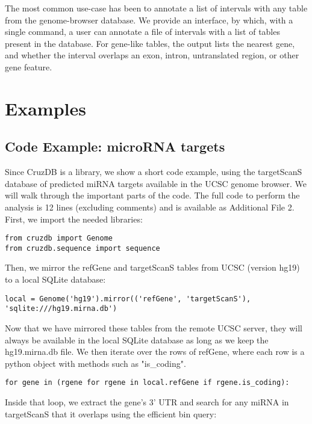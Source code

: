 \documentclass[10pt]{bmc_article}
\newenvironment{bmcformat}{\baselineskip20pt\sloppy\setboolean{publ}{false}}{\baselineskip20pt\sloppy}
\begin{document}
\begin{bmcformat}
The most common use-case has been to annotate a list of intervals with any table from the genome-browser database. We provide an interface, by which, with a single command, a user can annotate a file of intervals with a list of tables present in the database. For gene-like tables, the output lists the nearest gene, and whether the interval overlaps an exon, intron, untranslated region, or other gene feature.

\section*{Examples}


\subsection*{Code Example: microRNA targets}

Since CruzDB is a library, we show a short code example, using the targetScanS database of predicted miRNA targets \cite{Grimson} available in the UCSC genome browser. We will walk through the important parts of the code. The full code to perform the analysis is 12 lines (excluding comments) and is available as Additional File 2. First, we import the needed libraries:

\begin{verbatim}
from cruzdb import Genome
from cruzdb.sequence import sequence
\end{verbatim}

Then, we mirror the refGene and targetScanS tables from UCSC (version hg19) to a local SQLite database:

\begin{verbatim}
local = Genome('hg19').mirror(('refGene', 'targetScanS'), 'sqlite:///hg19.mirna.db')
\end{verbatim}

Now that we have mirrored these tables from the remote UCSC server, they will always be available in the local SQLite database as long as we keep the hg19.mirna.db file. We then iterate over the rows of refGene, where each row is a python object with methods such as "is\_coding".

\begin{verbatim}
for gene in (rgene for rgene in local.refGene if rgene.is_coding):
\end{verbatim}

Inside that loop, we extract the gene’s 3’ UTR and search for any miRNA in targetScanS that it overlaps using the efficient bin query:


\end{bmcformat}
\end{document}
